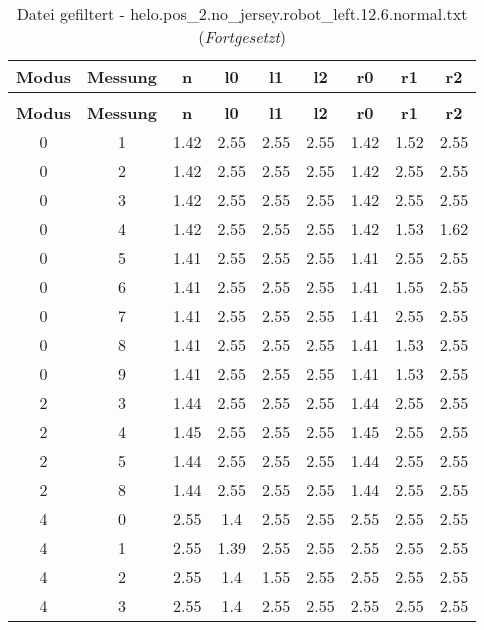 \clearpage{}
\begin{longtable}{|c|c||c||c|c|c||c|c|c|}
	\caption{Datei gefiltert - helo.pos\_2.no\_jersey.robot\_left.12.6.normal.txt} \label{tab:helo.pos-2.no-jersey.robot-left.12.6.normal.txt} \\ \hline
	\textbf{Modus} & \textbf{Messung} & \textbf{n} & \textbf{l0} & \textbf{l1} & \textbf{l2} & \textbf{r0} & \textbf{r1} & \textbf{r2}\\ \hline
	\endfirsthead
	\caption[]{Datei gefiltert - helo.pos\_2.no\_jersey.robot\_left.12.6.normal.txt (\emph{Fortgesetzt})} \\ \hline
	\textbf{Modus} & \textbf{Messung} & \textbf{n} & \textbf{l0} & \textbf{l1} & \textbf{l2} & \textbf{r0} & \textbf{r1} & \textbf{r2}\\ \hline
	\endhead
	0 & 1 & 1.42 & 2.55 & 2.55 & 2.55 & 1.42 & 1.52 & 2.55 \\ \hline
	0 & 2 & 1.42 & 2.55 & 2.55 & 2.55 & 1.42 & 2.55 & 2.55 \\ \hline
	0 & 3 & 1.42 & 2.55 & 2.55 & 2.55 & 1.42 & 2.55 & 2.55 \\ \hline
	0 & 4 & 1.42 & 2.55 & 2.55 & 2.55 & 1.42 & 1.53 & 1.62 \\ \hline
	0 & 5 & 1.41 & 2.55 & 2.55 & 2.55 & 1.41 & 2.55 & 2.55 \\ \hline
	0 & 6 & 1.41 & 2.55 & 2.55 & 2.55 & 1.41 & 1.55 & 2.55 \\ \hline
	0 & 7 & 1.41 & 2.55 & 2.55 & 2.55 & 1.41 & 2.55 & 2.55 \\ \hline
	0 & 8 & 1.41 & 2.55 & 2.55 & 2.55 & 1.41 & 1.53 & 2.55 \\ \hline
	0 & 9 & 1.41 & 2.55 & 2.55 & 2.55 & 1.41 & 1.53 & 2.55 \\ \hline
	2 & 3 & 1.44 & 2.55 & 2.55 & 2.55 & 1.44 & 2.55 & 2.55 \\ \hline
	2 & 4 & 1.45 & 2.55 & 2.55 & 2.55 & 1.45 & 2.55 & 2.55 \\ \hline
	2 & 5 & 1.44 & 2.55 & 2.55 & 2.55 & 1.44 & 2.55 & 2.55 \\ \hline
	2 & 8 & 1.44 & 2.55 & 2.55 & 2.55 & 1.44 & 2.55 & 2.55 \\ \hline
	4 & 0 & 2.55 & 1.4 & 2.55 & 2.55 & 2.55 & 2.55 & 2.55 \\ \hline
	4 & 1 & 2.55 & 1.39 & 2.55 & 2.55 & 2.55 & 2.55 & 2.55 \\ \hline
	4 & 2 & 2.55 & 1.4 & 1.55 & 2.55 & 2.55 & 2.55 & 2.55 \\ \hline
	4 & 3 & 2.55 & 1.4 & 2.55 & 2.55 & 2.55 & 2.55 & 2.55 \\ \hline

\end{longtable}
